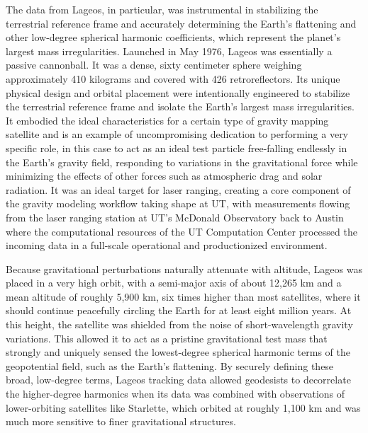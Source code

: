 The data from Lageos, in particular, was instrumental in stabilizing the terrestrial reference frame and accurately determining the Earth’s flattening and other low-degree spherical harmonic coefficients, which represent the planet's largest mass irregularities. Launched in May 1976, Lageos was essentially a passive cannonball. It was a dense, sixty centimeter sphere weighing approximately 410 kilograms and covered with 426 retroreflectors. Its unique physical design and orbital placement were intentionally engineered to stabilize the terrestrial reference frame and isolate the Earth's largest mass irregularities. It embodied the ideal characteristics for a certain type of gravity mapping satellite and is an example of uncompromising dedication to performing a very specific role, in this case to act as an ideal test particle free-falling endlessly in the Earth’s gravity field, responding to variations in the gravitational force while minimizing the effects of other forces such as atmospheric drag and solar radiation. It was an ideal target for laser ranging, creating a core component of the gravity modeling workflow taking shape at UT, with measurements flowing from the laser ranging station at UT’s McDonald Observatory back to Austin where the computational resources of the UT Computation Center processed the incoming data in a full-scale operational and productionized environment. 

Because gravitational perturbations naturally attenuate with altitude, Lageos was placed in a very high orbit, with a semi-major axis of about 12,265 km and a mean altitude of roughly 5,900 km, six times higher than most satellites, where it should continue peacefully circling the Earth for at least eight million years. At this height, the satellite was shielded from the noise of short-wavelength gravity variations. This allowed it to act as a pristine gravitational test mass that strongly and uniquely sensed the lowest-degree spherical harmonic terms of the geopotential field, such as the Earth's flattening. By securely defining these broad, low-degree terms, Lageos tracking data allowed geodesists to decorrelate the higher-degree harmonics when its data was combined with observations of lower-orbiting satellites like Starlette, which orbited at roughly 1,100 km and was much more sensitive to finer gravitational structures.

